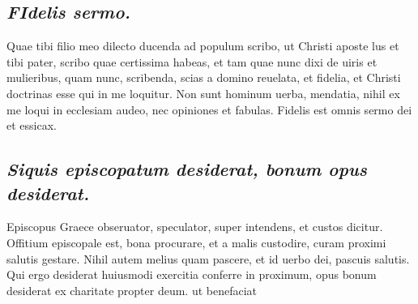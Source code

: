 \documentclass{article}
\begin{document}
\begin{pages}
\subsection*{\textit{\huge\textbf{F}\normalsize Idelis sermo. }}\pstart Quae tibi filio meo dilecto ducenda ad populum scribo, ut Christi aposte lus et tibi pater, scribo quae certissima habeas, et tam quae nunc dixi de uiris et mulieribus, quam nunc, scribenda, scias a domino reuelata, et fidelia, et Christi doctrinas esse qui in me loquitur. Non sunt hominum uerba, mendatia, nihil ex me loqui in ecclesiam audeo, nec opiniones et fabulas. Fidelis est omnis sermo dei et essicax.  \pend
{}
{}
\subsection*{\textit{Siquis episcopatum desiderat, bonum opus desiderat. }}\pstart Episcopus Graece obseruator, speculator, super intendens, et custos dicitur. Offitium episcopale est, bona procurare, et a malis custodire, curam proximi salutis gestare. Nihil autem melius quam pascere, et id uerbo dei, pascuis salutis. Qui ergo desiderat huiusmodi exercitia conferre in proximum, opus bonum desiderat ex charitate propter deum. ut benefaciat  \pend
\endnumbering
\end{pages}
\end{document}
